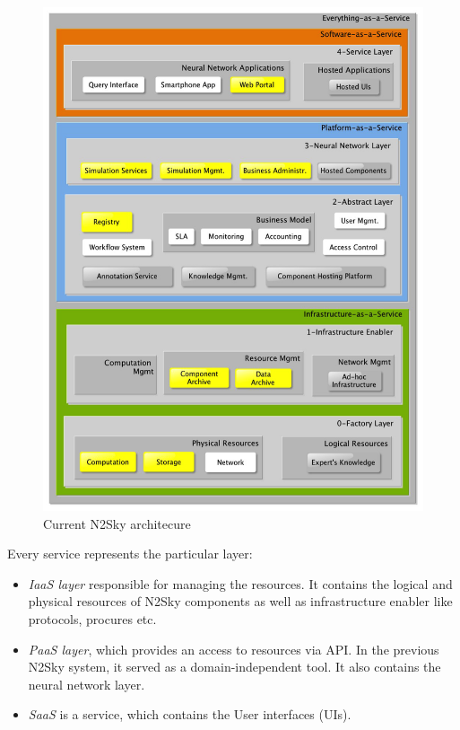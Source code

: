 \begin{figure}[htbp]
\begin{center}
  \includegraphics[width=\linewidth]{components/2/current_arch.png}
  \caption{Current N2Sky architecure}
  \label{fig:current_arch}
\end{center}
\end{figure}

Every service represents the particular layer:
\begin{itemize}
\item \emph{IaaS layer}  responsible for managing the resources. It contains the logical and physical resources of N2Sky components as well as infrastructure enabler like protocols, procures etc. 
\item \emph{PaaS layer}, which provides an access to resources via API. In the previous N2Sky system, it served as a domain-independent tool. It also contains the neural network layer.
\item \emph{SaaS} is a service, which contains the User interfaces (UIs).
\end{itemize}

